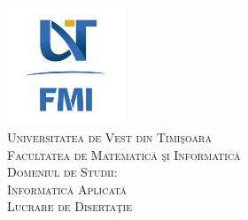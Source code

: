 \documentclass[12pt, a4paper]{report}
\begin{document}

\begin{titlepage}

	\newcommand{\HRule}{\rule{\linewidth}{0.5mm}} %

	\center %


	\vspace{-20pt}
	\includegraphics[width=100pt]{FMI-03.png}\\[1.0cm] %

	\textsc{\LARGE Universitatea de Vest din Timi\c{s}oara}\\[0.5cm] %
	\textsc{\Large Facultatea de Matematic\u{a} \c{s}i Informatic\u{a}}\\[0.5cm] %
	\textsc{\large Domeniul de Studii: \\Informatic\u{a} Aplicat\u{a}}\\[3cm] %


	\textsc{\Huge Lucrare de Diserta\c tie}\\[5cm]



\end{titlepage}
\end{document}
